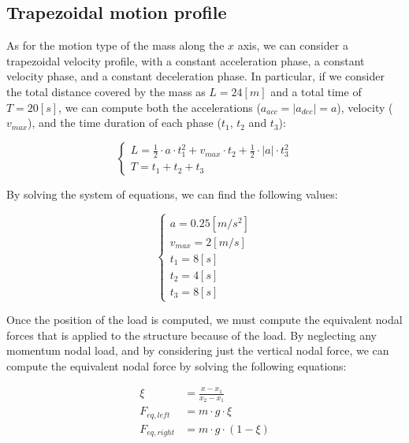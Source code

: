 \subsection{Trapezoidal motion profile}
\label{subsec:trapezoidal_motion_profile}

As for the motion type of the mass along the $x$ axis, we can consider a trapezoidal velocity profile, with a constant acceleration phase, a constant velocity phase, and a constant deceleration phase.
In particular, if we consider the total distance covered by the mass as $L = 24[m]$ and a total time of $T = 20[s]$, we can compute both the accelerations ($a_{acc} = |a_{dec}| = a$), velocity ($v_{max}$), and the time duration of each phase ($t_1$, $t_2$ and $t_3$):

\begin{equation}
    \begin{cases}
        L = \frac{1}{2} \cdot a \cdot t_1^2 + v_{max} \cdot t_2 + \frac{1}{2} \cdot |a| \cdot t_3^2 \\
        T = t_1 + t_2 + t_3
    \end{cases}
\end{equation}

By solving the system of equations, we can find the following values:

\begin{equation}
    \begin{cases}
        a = 0.25 [m/s^2]  \\
        v_{max} = 2 [m/s] \\
        t_1 = 8 [s]       \\
        t_2 = 4 [s]       \\
        t_3 = 8 [s]
    \end{cases}
\end{equation}

Once the position of the load is computed, we must compute the equivalent nodal forces that is applied to the structure because of the load.
By neglecting any momentum nodal load, and by considering just the vertical nodal force, we can compute the equivalent nodal force by solving the following equations:

\begin{align}
    \xi           & = \frac{x - x_1}{x_2 - x_1} \\
    F_{eq, left}  & = m \cdot g \cdot \xi       \\
    F_{eq, right} & = m \cdot g \cdot (1 - \xi)
    \label{eq:equivalent_nodal_force}
\end{align}

